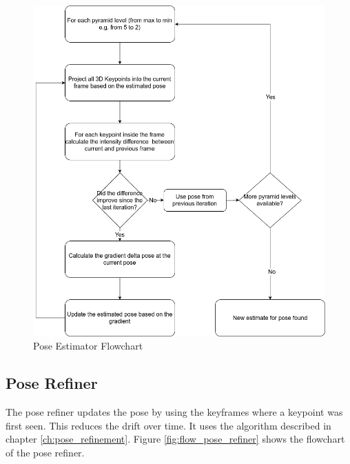 \documentclass[11pt,a4paper,titlepage,oneside]{report}
\begin{document}
\begin{figure}[H]
  \centering
  \includegraphics[scale=0.3]{img/flow_pose_estimator.png}
  \caption{Pose Estimator Flowchart}\label{fig:flow_pose_estimator}
\end{figure}

\newpage\subsection{Pose Refiner}

The pose refiner updates the pose by using the keyframes where a keypoint was first seen. This reduces the drift over time. It uses the algorithm described in chapter \ref{ch:pose_refinement}. Figure \ref{fig:flow_pose_refiner} shows the flowchart of the pose refiner.
\end{document}
